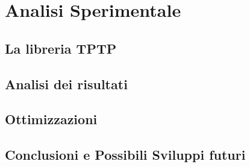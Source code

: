 \documentclass[./main.tex]{subfiles}
\begin{document}
\chapter{Analisi Sperimentale}
\section{La libreria TPTP}
\section{Analisi dei risultati}
\section{Ottimizzazioni}
\section{Conclusioni e Possibili Sviluppi futuri}
\end{document}
